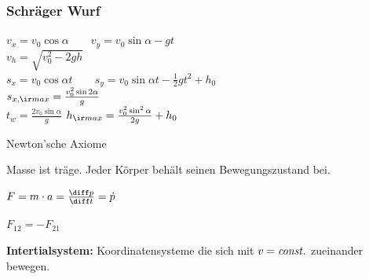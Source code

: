 \documentclass[german]{latex4ei/latex4ei_sheet}
\begin{document}
\begin{sectionbox}
\subsubsection{Schräger Wurf}
$v_x=v_0\cos \alpha \qquad v_y=v_0\sin \alpha -gt$\\
$v_h=\sqrt{v_0^2-2gh}$\\
$s_x=v_0\cos \alpha t \qquad s_y=v_0 \sin \alpha t - \frac{1}{2} gt^2 +h_0$\\
$s_{x,\ir max}=\frac{v_0^2 \sin{2\alpha}}{g}$\\
$t_w=\frac{2v_0\sin \alpha}{g}$ \qquad
$h_{\ir max}=\frac{v_0^2 \sin^2 \alpha}{2g}+h_0$ \\

\begin{cookbox}{Newton'sche Axiome}
	\item Masse ist träge. Jeder Körper behält seinen Bewegungszustand bei.
	\item $F=m\cdot a=\frac{\diff p}{\diff t}=\dot{p}$
	\item $F_{12}=-F_{21}$
\end{cookbox}
\textbf{Intertialsystem:} Koordinatensysteme die sich mit $v=\it const.$ zueinander bewegen.
\end{sectionbox}
\end{document}
